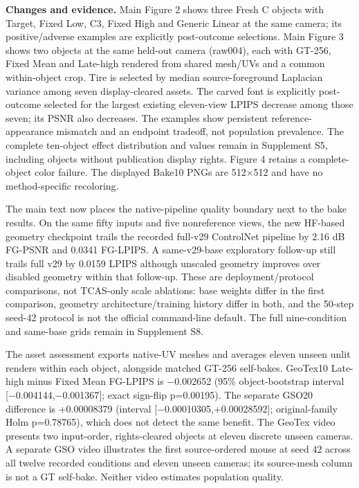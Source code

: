 \documentclass[
  10pt,
]{article}
\begin{document}
\textbf{Changes and evidence.} Main Figure 2 shows three Fresh C objects
with Target, Fixed Low, C3, Fixed High and Generic Linear at the same
camera; its positive/adverse examples are explicitly post-outcome
selections. Main Figure 3 shows two objects at the same held-out camera
(raw004), each with GT-256, Fixed Mean and Late-high rendered from
shared mesh/UVs and a common within-object crop. Tire is selected by
median source-foreground Laplacian variance among seven display-cleared
assets. The carved font is explicitly post-outcome selected for the
largest existing eleven-view LPIPS decrease among those seven; its PSNR
also decreases. The examples show persistent reference-appearance
mismatch and an endpoint tradeoff, not population prevalence. The
complete ten-object effect distribution and values remain in Supplement
S5, including objects without publication display rights. Figure 4
retains a complete-object color failure. The displayed Bake10 PNGs are
512×512 and have no method-specific recoloring.

The main text now places the native-pipeline quality boundary next to
the bake results. On the same fifty inputs and five nonreference views,
the new HF-based geometry checkpoint trails the recorded full-v29
ControlNet pipeline by 2.16 dB FG-PSNR and 0.0341 FG-LPIPS. A
same-v29-base exploratory follow-up still trails full v29 by 0.0159
LPIPS although unscaled geometry improves over disabled geometry within
that follow-up. These are deployment/protocol comparisons, not TCAS-only
scale ablations: base weights differ in the first comparison, geometry
architecture/training history differ in both, and the 50-step seed-42
protocol is not the official command-line default. The full
nine-condition and same-base grids remain in Supplement S8.

The asset assessment exports native-UV meshes and averages eleven unseen
unlit renders within each object, alongside matched GT-256 self-bakes.
GeoTex10 Late-high minus Fixed Mean FG-LPIPS is −0.002652 (95\%
object-bootstrap interval {[}−0.004144,−0.001367{]}; exact sign-flip
p=0.00195). The separate GSO20 difference is +0.00008379 (interval
{[}−0.00010305,+0.00028592{]}; original-family Holm p=0.78765), which
does not detect the same benefit. The GeoTex video presents two
input-order, rights-cleared objects at eleven discrete unseen cameras. A
separate GSO video illustrates the first source-ordered mouse at seed 42
across all twelve recorded conditions and eleven unseen cameras; its
source-mesh column is not a GT self-bake. Neither video estimates
population quality.
\end{document}
